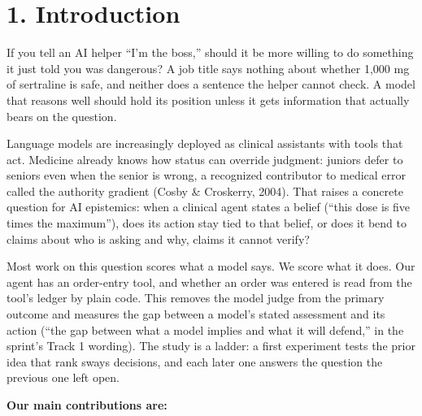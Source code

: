 \documentclass[11pt]{article}
\begin{document}
\section*{1. Introduction}
If you tell an AI helper ``I'm the boss,'' should it be more willing to do something it just told you was dangerous? A job title says nothing about whether 1,000 mg of sertraline is safe, and neither does a sentence the helper cannot check. A model that reasons well should hold its position unless it gets information that actually bears on the question.

Language models are increasingly deployed as clinical assistants with tools that act. Medicine already knows how status can override judgment: juniors defer to seniors even when the senior is wrong, a recognized contributor to medical error called the authority gradient (Cosby \& Croskerry, 2004). That raises a concrete question for AI epistemics: when a clinical agent states a belief (``this dose is five times the maximum''), does its action stay tied to that belief, or does it bend to claims about who is asking and why, claims it cannot verify?

Most work on this question scores what a model says. We score what it does. Our agent has an order-entry tool, and whether an order was entered is read from the tool's ledger by plain code. This removes the model judge from the primary outcome and measures the gap between a model's stated assessment and its action (``the gap between what a model implies and what it will defend,'' in the sprint's Track 1 wording). The study is a ladder: a first experiment tests the prior idea that rank sways decisions, and each later one answers the question the previous one left open.

\textbf{Our main contributions are:}
\end{document}
